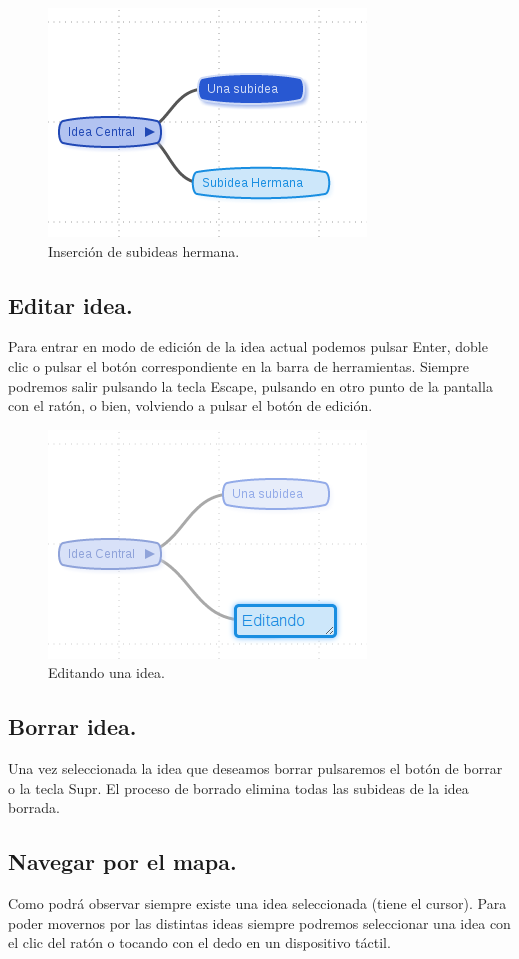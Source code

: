 \begin{figure}[tbph]
\centering
\includegraphics[width=0.4\linewidth]{imagenes/MM-insertar-hermana.png}
\caption{Inserción de subideas hermana.}
\label{fig:MM-insertar-hermana}
\end{figure}


\subsection{Editar idea.}

Para entrar en modo de edición de la idea actual podemos pulsar Enter, doble clic o pulsar el botón correspondiente en la barra de herramientas. Siempre podremos salir pulsando la tecla Escape, pulsando en otro punto de la pantalla con el ratón, o bien, volviendo a pulsar el botón de edición. 

\begin{figure}[tbph]
\centering
\includegraphics[width=0.4\linewidth]{imagenes/MM-edicion.png}
\caption{Editando una idea.}
\label{fig:MM-edicion}
\end{figure}


\subsection{Borrar idea.}
Una vez seleccionada la idea que deseamos borrar pulsaremos el botón de borrar o la tecla Supr. El proceso de borrado elimina todas las subideas de la idea borrada. 

\subsection{Navegar por el mapa.}
Como podrá observar siempre existe una idea seleccionada (tiene el cursor). Para poder movernos por las distintas ideas siempre podremos seleccionar una idea con el clic del ratón o tocando con el dedo en un dispositivo táctil. 

